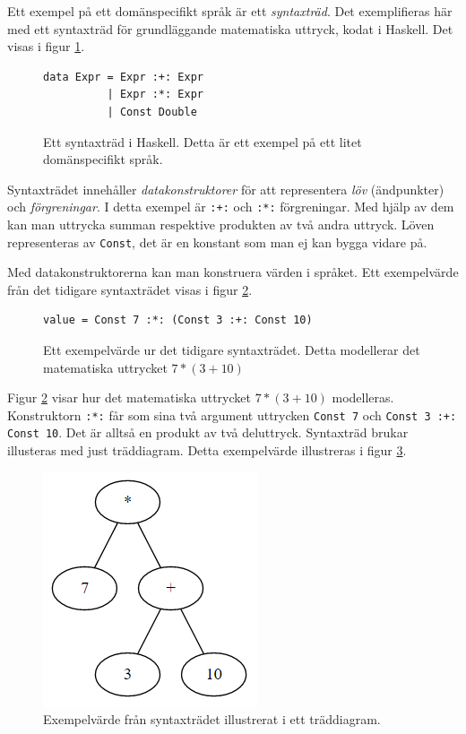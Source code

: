 \begin{draft}
Ett exempel på ett domänspecifikt språk är ett \textit{syntaxträd}. Det exemplifieras här med ett syntaxträd för grundläggande matematiska uttryck, kodat i Haskell. Det visas i figur \ref{fig:syntax_exempel}.

\begin{figure}[tph]
  \begin{lstlisting}
data Expr = Expr :+: Expr
          | Expr :*: Expr
          | Const Double
  \end{lstlisting}
  \caption{Ett syntaxträd i Haskell. Detta är ett exempel på ett litet domänspecifikt språk.}
  \label{fig:syntax_exempel}
\end{figure}

Syntaxträdet innehåller \textit{datakonstruktorer} för att representera \textit{löv} (ändpunkter) och \textit{förgreningar}. I detta exempel är \texttt{:+:} och \texttt{:*:} förgreningar. Med hjälp av dem kan man uttrycka summan respektive produkten av två andra uttryck. Löven representeras av \texttt{Const}, det är en konstant som man ej kan bygga vidare på.

Med datakonstruktorerna kan man konstruera värden i språket. Ett exempelvärde från det tidigare syntaxträdet visas i figur \ref{fig:syntax_exempel_varde}.

\begin{figure}[tph]
  \begin{lstlisting}
value = Const 7 :*: (Const 3 :+: Const 10)
  \end{lstlisting}
  \caption{Ett exempelvärde ur det tidigare syntaxträdet. Detta modellerar det matematiska uttrycket $7 * (3 + 10)$}
  \label{fig:syntax_exempel_varde}
\end{figure}

Figur \ref{fig:syntax_exempel_varde} visar hur det matematiska uttrycket $7 * (3 + 10)$ modelleras. Konstruktorn \texttt{:*:} får som sina två argument uttrycken \texttt{Const 7} och \texttt{Const 3 :+: Const 10}. Det är alltså en produkt av två deluttryck. Syntaxträd brukar illusteras med just träddiagram. Detta exempelvärde illustreras i figur \ref{fig:syntax_exempel_bild}.

\begin{figure}[tph]
  \centering
  \includegraphics[width=0.4\linewidth]{figure/syntax_exempel_bild.png}
  \caption{Exempelvärde från syntaxträdet illustrerat i ett träddiagram.}
  \label{fig:syntax_exempel_bild}
\end{figure}


\end{draft}
